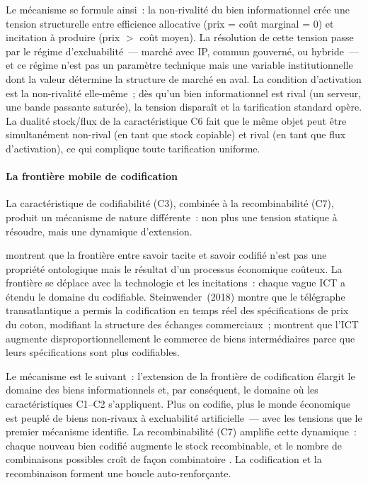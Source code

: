 Le mécanisme se formule ainsi~: la non-rivalité du bien informationnel crée une tension structurelle entre efficience allocative (prix = coût marginal = 0) et incitation à produire (prix $>$ coût moyen). La résolution de cette tension passe par le régime d'excluabilité~--- marché avec IP, commun gouverné, ou hybride~--- et ce régime n'est pas un paramètre technique mais une variable institutionnelle dont la valeur détermine la structure de marché en aval. La condition d'activation est la non-rivalité elle-même~; dès qu'un bien informationnel est rival (un serveur, une bande passante saturée), la tension disparaît et la tarification standard opère. La dualité stock/flux de la caractéristique C6 fait que le même objet peut être simultanément non-rival (en tant que stock copiable) et rival (en tant que flux d'activation), ce qui complique toute tarification uniforme.


\paragraph{La frontière mobile de codification}

\markEVO
La caractéristique de codifiabilité (C3), combinée à la recombinabilité (C7), produit un mécanisme de nature différente~: non plus une tension statique à résoudre, mais une dynamique d'extension.

\textcite{cowan_explicit_2000} montrent que la frontière entre savoir tacite et savoir codifié n'est pas une propriété ontologique mais le résultat d'un processus économique coûteux.  La frontière se déplace avec la technologie et les incitations~: chaque vague ICT a étendu le domaine du codifiable. Steinwender~(2018) montre que le télégraphe transatlantique a permis la codification en temps réel des spécifications de prix du coton, modifiant la structure des échanges commerciaux~; \textcite{juhasz_spinning_2018} montrent que l'ICT augmente disproportionnellement le commerce de biens intermédiaires parce que leurs spécifications sont plus codifiables.

Le mécanisme est le suivant~: l'extension de la frontière de codification élargit le domaine des biens informationnels et, par conséquent, le domaine où les caractéristiques C1--C2 s'appliquent. Plus on codifie, plus le monde économique est peuplé de biens non-rivaux à excluabilité artificielle~--- avec les tensions que le premier mécanisme identifie. La recombinabilité (C7) amplifie cette dynamique~: chaque nouveau bien codifié augmente le stock recombinable, et le nombre de combinaisons possibles croît de façon combinatoire \parencite{weitzman_recombinant_1998}. La codification et la recombinaison forment une boucle auto-renforçante.

